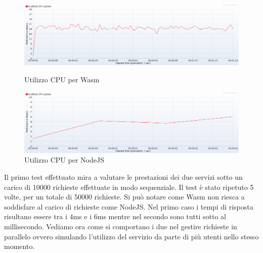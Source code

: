 \begin{figure}[!htb]
        \includegraphics[width=\linewidth]{chapters/3.poc/benchmarks_images/wasi_10000_single_req_cpu.png}
        \caption{Utilizzo CPU per Wasm}\label{fig:10000_req_wasi_cpu} \endminipage\hfill
        \includegraphics[width=\linewidth]{chapters/3.poc/benchmarks_images/node_10000_single_req_cpu.png}
        \caption{Utilizzo CPU per NodeJS}\label{fig:10000_req_node_cpu} \endminipage\hfill
\end{figure}

Il primo test effettuato mira a valutare le prestazioni dei due servizi sotto un carico di 10000 richieste effettuate in
modo sequenziale. Il test è stato ripetuto 5 volte, per un totale di 50000 richieste. Si può notare come Wasm non riesca
a soddisfare al carico di richieste come NodeJS. Nel primo caso i tempi di risposta risultano essere tra i 4ms e i 6ms
mentre nel secondo sono tutti sotto al millisecondo. Vediamo ora come si comportano i due nel gestire richieste in
parallelo ovvero simulando l'utilizzo del servizio da parte di più utenti nello stesso momento.

